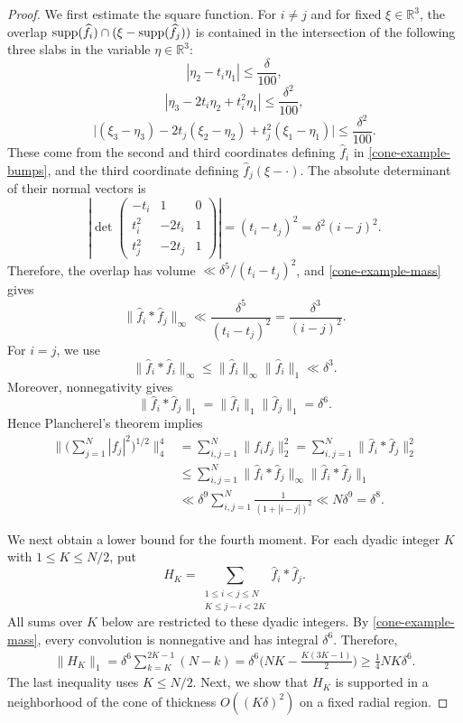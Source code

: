 \documentclass{amsart}
\numberwithin{equation}{section}
\newcommand{\wh}{\widehat}
\newcommand{\ZR}{\mathbb{R}}
\newcommand{\supp}{{\rm supp}}
\begin{document}
\begin{proof}
We first estimate the square function.
For $i\ne j$ and for fixed $\xi\in\ZR^3$, the overlap
$\supp(\wh f_i)\cap(\xi-\supp(\wh f_j))$ is contained in the intersection of the following three slabs in the variable $\eta\in\ZR^3$:
\[
      |\eta_2-t_i\eta_1| \leq\frac{\delta}{100},
\]
\[
    |\eta_3-2t_i\eta_2+t_i^2\eta_1|
    \leq\frac{\delta^2}{100},
\]
\[
    \big|(\xi_3-\eta_3)-2t_j(\xi_2-\eta_2)
    +t_j^2(\xi_1-\eta_1)\big|
    \leq\frac{\delta^2}{100}.
\]
These come from the second and third coordinates defining $\wh f_i$ in \eqref{cone-example-bumps}, and the third coordinate defining $\wh f_j(\xi-\cdot)$.
The absolute determinant of their normal vectors is
\[
    \left|
    \det\begin{pmatrix}
        -t_i&1&0\\
        t_i^2&-2t_i&1\\
        t_j^2&-2t_j&1
    \end{pmatrix}
    \right|
    =(t_i-t_j)^2=\delta^2(i-j)^2.
\]
Therefore, the overlap has volume
$\ll\delta^5/(t_i-t_j)^2$, and \eqref{cone-example-mass} gives
\[
    \|\wh f_i*\wh f_j\|_\infty
    \ll\frac{\delta^5}{(t_i-t_j)^2}
    =\frac{\delta^3}{(i-j)^2}.
\]
For $i=j$, we use
\[
    \|\wh f_i*\wh f_i\|_\infty
    \leq\|\wh f_i\|_\infty\|\wh f_i\|_1
    \ll\delta^3.
\]
Moreover, nonnegativity gives
\[
    \|\wh f_i*\wh f_j\|_1
    =\|\wh f_i\|_1\|\wh f_j\|_1
    =\delta^6.
\]
Hence Plancherel's theorem implies
\begin{equation}
\label{cone-example-denominator}
\begin{aligned}
    \Big\|\Big(\sum_{j=1}^N|f_j|^2\Big)^{1/2}\Big\|_4^4
    &=\sum_{i,j=1}^N\|f_if_j\|_2^2
    =\sum_{i,j=1}^N\|\wh f_i*\wh f_j\|_2^2\\
    &\leq\sum_{i,j=1}^N
    \|\wh f_i*\wh f_j\|_\infty
    \|\wh f_i*\wh f_j\|_1\\
    &\ll\delta^9
    \sum_{i,j=1}^N\frac1{(1+|i-j|)^2}
    \ll N\delta^9=\delta^8.
\end{aligned}
\end{equation}

\medskip

We next obtain a lower bound for the fourth moment.
For each dyadic integer $K$ with $1\leq K\leq N/2$, put
\[
    H_K=
    \sum_{\substack{1\leq i<j\leq N\\K\leq j-i<2K}}
    \wh f_i*\wh f_j.
\]
All sums over $K$ below are restricted to these dyadic integers.
By \eqref{cone-example-mass}, every convolution is nonnegative
and has integral $\delta^6$. Therefore,
\begin{equation}
\label{cone-example-dyadic-mass}
\begin{aligned}
    \|H_K\|_1=\delta^6\sum_{k=K}^{2K-1}(N-k)=\delta^6\Big(NK-\frac{K(3K-1)}2\Big)
      \geq\frac14NK\delta^6.
\end{aligned}
\end{equation}
The last inequality uses $K\leq N/2$.
Next, we show that $H_K$ is supported in a neighborhood of the
cone of thickness $O((K\delta)^2)$ on a fixed radial region.


\end{proof}
\end{document}
